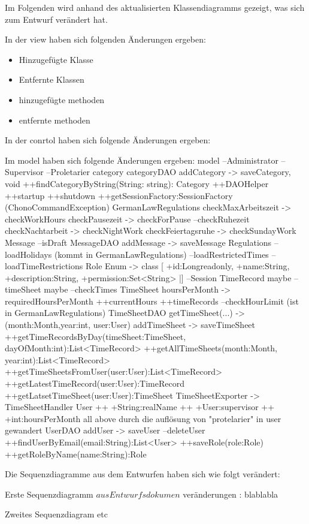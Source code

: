 Im Folgenden wird anhand des aktualisierten Klassendiagramms gezeigt, was sich zum Entwurf verändert hat.


In der view haben sich folgenden Änderungen ergeben:
  \begin{itemize}
      \item Hinzugefügte Klasse
      \item Entfernte Klassen
      \item hinzugefügte methoden
      \item entfernte methoden
  \end{itemize}
  
In der conrtol haben sich folgende Änderungen ergeben:

Im model haben sich folgende Änderungen ergeben: %
model
  --Administrator
  --Supervisor
  --Proletarier
  category 
  categoryDAO
    addCategory -> saveCategory, void
    ++findCategoryByString(String: string): Category
  ++DAOHelper
    ++startup
    ++shutdown
    ++getSessionFactory:SessionFactory
  (ChonoCommandException)
  GermanLawRegulations
    checkMaxArbeitszeit ->  checkWorkHours
    checkPausezeit -> checkForPause
    --checkRuhezeit
    checkNachtarbeit -> checkNightWork
    checkFeiertagsruhe -> checkSundayWork
  Message
    --isDraft
  MessageDAO
    addMessage -> saveMessage
  Regulations
    --loadHolidays (kommt in GermanLawRegulations)
    --loadRestrictedTimes
    --loadTimeRestrictions
  Role
    Enum -> class
    [ +id:Long{readonly}, +name:String, +description:String, +permission:Set<String> |]
  --Session
  TimeRecord
    maybe --timeSheet
    maybe --checkTimes
  TimeSheet
    hoursPerMonth -> requiredHoursPerMonth
    ++currentHours
    ++timeRecords
    --checkHourLimit (ist in GermanLawRegulations)
   TimeSheetDAO
    getTimeSheet(...) -> (month:Month,year:int, user:User) 
    addTimeSheet -> saveTimeSheet
    ++getTimeRecordsByDay(timeSheet:TimeSheet, dayOfMonth:int):List<TimeRecord>
    ++getAllTimeSheets(month:Month, year:int):List<TimeRecord>
    ++getTimeSheetsFromUser(user:User):List<TimeRecord>
    ++getLatestTimeRecord(user:User):TimeRecord
    ++getLatsetTimeSheet(user:User):TimeSheet
    TimeSheetExporter -> TimeSheetHandler
    User
      ++ +String:realName
      ++ +User:supervisor
      ++ +int:hoursPerMonth
      all above durch die auflösung von "protelarier" in user gewandert
    UserDAO
      addUser -> saveUser
      --deleteUser
      ++findUserByEmail(email:String):List<User>
      ++saveRole(role:Role)
      ++getRoleByName(name:String):Role
    

Die Sequenzdiagramme aus dem Entwurfen haben sich wie folgt verändert:

Erste Sequenzdiagramm \(aus Entwurfsdokumen\) 
 veränderungen : blablabla
 
 Zweites Sequenzdiagram
 etc
